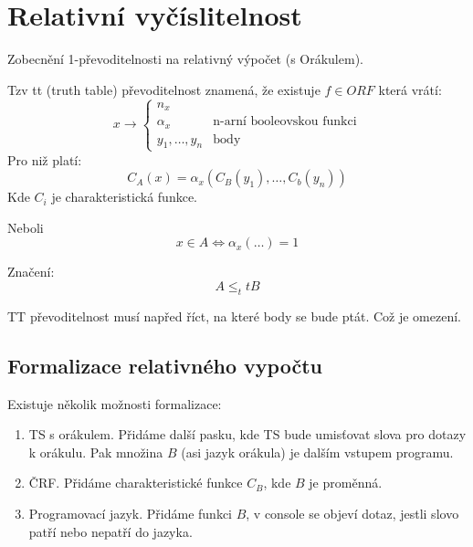 \section{\texorpdfstring{Relativní vyčíslitelnost}{Relativní vyčíslitelnost}}
\vspace{5mm}
\large

Zobecnění 1-převoditelnosti na relativný výpočet (s Orákulem).

\begin{definition}[tt-Převoditelnost]
	Tzv tt (truth table) převoditelnost znamená, že existuje $f \in ORF$ která vrátí:
	\[ x \to
		\left\{
		\begin{array}{lll}
			n_x \\
			\alpha_x & \text{n-arní booleovskou funkci} \\
			y_1, \ldots, y_n & \text{body}
		\end{array}
		\right.
	\]
	Pro niž platí:
	\[ C_A(x) = \alpha_x(C_B(y_1), \ldots, C_b(y_n))\]
	Kde $C_i$ je charakteristická funkce.

	Neboli
	\[ x \in A \iff \alpha_x(\ldots) = 1 \]

	Značení:
	\[ A \leq_tt B \]
\end{definition}

\begin{note}
	TT převoditelnost musí napřed říct, na které body se bude ptát.
	Což je omezení.
\end{note}

\subsection{Formalizace relativného vypočtu}

Existuje několik možnosti formalizace:
\begin{definition}
	\begin{enumerate}
		\item TS s orákulem. Přidáme další pasku, kde TS bude umisťovat slova pro dotazy k orákulu.
			Pak množina $B$ (asi jazyk orákula) je dalším vstupem programu.
		\item ČRF. Přidáme charakteristické funkce $C_B$, kde $B$ je proměnná.
		\item Programovací jazyk. Přidáme funkci $B$, v console se objeví dotaz, jestli slovo patří nebo nepatří do jazyka.
	\end{enumerate}
\end{definition}

